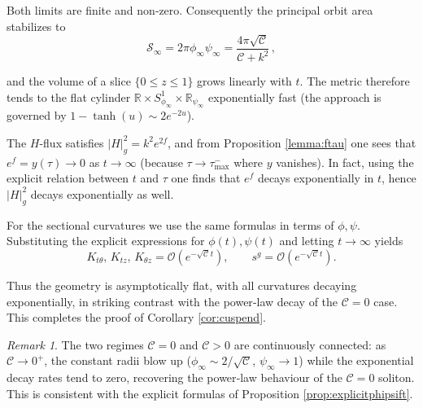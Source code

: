 \documentclass[12pt,a4paper,reqno]{amsart}
\theoremstyle{plain}
\theoremstyle{remark}
\newtheorem{remark}[theorem]{Remark}
\numberwithin{equation}{section}
\newcommand{\cC}{\mathcal{C}}
\newcommand{\cS}{\mathcal{S}}
\newcommand{\R}{\mathbb{R}}
\begin{document}
Both limits are finite and non‑zero. Consequently the principal orbit area stabilizes to
\begin{equation*}
\cS_{\infty}=2\pi\phi_{\infty}\psi_{\infty}= \frac{4\pi\sqrt{\cC}}{\cC+k^{2}} \,,
\end{equation*}

and the volume of a slice $\{0\le z\le 1\}$ grows linearly with $t$. The metric therefore tends to the flat cylinder $\R\times S^{1}_{\phi_{\infty}}\times \R_{\psi_{\infty}}$ exponentially fast (the approach is governed by $1-\tanh(u)\sim 2e^{-2u}$).  

The $H$-flux satisfies $|H|_{g}^{2}=k^{2}e^{2f}$, and from Proposition \ref{lemma:ftau} one sees that $e^{f}=y(\tau)\to 0$ as $t\to\infty$ (because $\tau\to\tau_{\max}^{-}$ where $y$ vanishes). In fact, using the explicit relation between $t$ and $\tau$ one finds that $e^{f}$ decays exponentially in $t$, hence $|H|_{g}^{2}$ decays exponentially as well.

For the sectional curvatures we use the same formulas in terms of $\phi,\psi$. Substituting the explicit expressions for $\phi(t),\psi(t)$ and letting $t\to\infty$ yields
\begin{equation*}
K_{t\theta},\,K_{tz},\,K_{\theta z}= \mathcal{O}\left(e^{-\sqrt{\cC}t}\right),
\qquad
s^{g}= \mathcal{O}\left(e^{-\sqrt{\cC}t}\right).
\end{equation*}

Thus the geometry is asymptotically flat, with all curvatures decaying exponentially, in striking contrast with the power‑law decay of the $\cC=0$ case. This completes the proof of Corollary \ref{cor:cuspend}.

\begin{remark}
The two regimes $\cC=0$ and $\cC>0$ are continuously connected: as $\cC\to 0^{+}$, the constant radii blow up ($\phi_{\infty}\sim 2/\sqrt{\cC}$, $\psi_{\infty}\to 1$) while the exponential decay rates tend to zero, recovering the power‑law behaviour of the $\cC=0$ soliton. This is consistent with the explicit formulas of Proposition \ref{prop:explicitphipsift}.
\end{remark}
\end{document}
